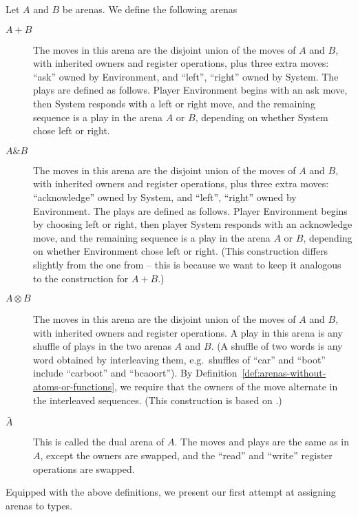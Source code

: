 \begin{definition}\label{def:composition-of-arenas}
    Let  $A$ and $B$ be arenas. We define the following arenas
        \begin{description}
            \item[$A+B$] The moves in this arena are the disjoint union of the moves of $A$ and $B$, with inherited owners and register operations, plus three extra moves: ``ask'' owned by Environment, and ``left'', ``right'' owned by System. 
            The plays are defined as follows. Player Environment begins with  an ask move, then System responds with a left or right move, and the remaining sequence is a play in the arena $A$ or $B$, depending on whether System chose left or right.
            \item[$A \& B$] The moves in this arena are the disjoint union of the moves of $A$ and $B$, with inherited owners and register operations, plus three extra moves: ``acknowledge'' owned by System, and ``left'', ``right'' owned by Environment. 
            The plays are defined as follows. Player Environment begins by choosing left or right, then player System responds with an acknowledge move, and the remaining sequence is a play  in the arena $A$ or $B$, depending on whether Environment chose left or right. (This construction differs slightly from the one from \cite[Excercise~1.10]{abramsky2013semantics} -- this is because we want to keep it analogous to the construction for $A + B$.)
            \item[$A \otimes B$] The moves in this arena are the disjoint union of the moves of $A$ and $B$, with inherited owners and register operations. A play in this arena is any shuffle of plays in the two arenas $A$ and $B$. (A shuffle of two words is any word obtained by interleaving them, e.g.~shuffles of ``car'' and ``boot'' include ``carboot'' and ``bcaoort'').
            By Definition~\ref{def:arenas-without-atoms-or-functions}, we require that the owners of the move alternate in the 
            interleaved sequences. (This construction is based on \cite[p.7]{abramsky2013semantics}.)
            \item[$\bar A$] This is called the dual arena of $A$. The moves and plays are the same as in $A$, except the owners are swapped, and the ``read'' and ``write'' register operations are swapped.
        \end{description} 
\end{definition}

Equipped with the above definitions, we  present our first attempt at assigning arenas to types. 

